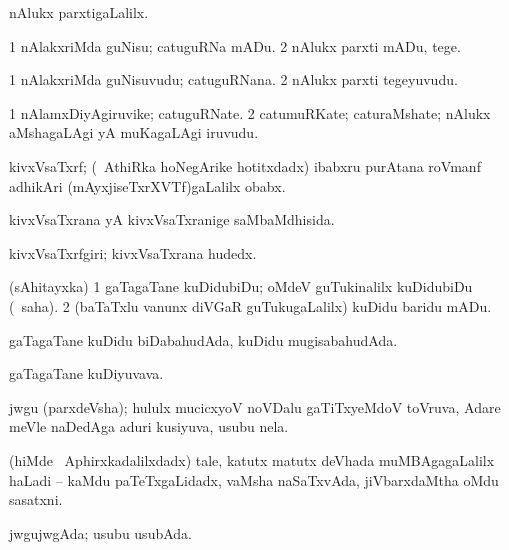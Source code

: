 \noindent
\gl{\pagu}
\bmng
{} nAlukx parxtigaLalilx. 
\emng
\eentry


\bentry
{}
\gl{\sakirx}
\bmng
\bnum
\num{1} nAlakxriMda guNisu; catuguRNa mADu. 
\num{2} nAlukx parxti mADu, tege. 
\enum
\emng
\eentry


\bentry
{}
\gl{\nA}
\bmng
\bnum
\num{1} nAlakxriMda guNisuvudu; catuguRNana. 
\num{2} nAlukx parxti tegeyuvudu. 
\enum
\emng
\eentry


\bentry
{}
\gl{\nA}
\bmng
\bnum
\num{1} nAlamxDiyAgiruvike; catuguRNate. 
\num{2} catumuRKate; caturaMshate; nAlukx aMshagaLAgi yA muKagaLAgi iruvudu. 
\enum
\emng
\eentry


\bentry
{}
\gl{\nA}
\bmng
kivxVsaTxrf; (\kanmu\ AthiRka hoNegArike hotitxdadx) ibabxru purAtana roVmanf adhikAri (mAyxjiseTxrXVTf)gaLalilx obabx. 
\emng
\eentry


\bentry
{}
\gl{\gu}
\bmng
kivxVsaTxrana yA kivxVsaTxranige saMbaMdhisida. 
\emng
\eentry

\bentry
{}
\gl{\nA}
\bmng
kivxVsaTxrfgiri; kivxVsaTxrana hudedx. 
\emng
\eentry

\bentry
{}
\gl{\sakirx}
\bmng
(sAhitayxka) 
\bnum
\num{1} gaTagaTane kuDidubiDu; oMdeV guTukinalilx kuDidubiDu (\akirx\ saha). 
\num{2} (baTaTxlu \mo vanunx diVGaR guTukugaLalilx) kuDidu baridu mADu. 
\enum
\emng
\eentry

\bentry
{}
\gl{\gu}
\bmng
gaTagaTane kuDidu biDabahudAda, kuDidu mugisabahudAda. 
\emng
\eentry

\bentry
{}
\gl{\nA}
\bmng
gaTagaTane kuDiyuvava. 
\emng
\eentry

\bentry
{}
\gl{\nA}
\bmng
jwgu (parxdeVsha); hululx mucicxyoV noVDalu gaTiTxyeMdoV toVruva, Adare meVle naDedAga aduri kusiyuva, usubu nela. 
\emng
\eentry

\bentry
{}
\gl{\nA}
\bmng
(hiMde \da\ Aphirxkadalilxdadx) tale, katutx matutx deVhada muMBAgagaLalilx haLadi -- kaMdu paTeTxgaLidadx, vaMsha naSaTxvAda, jiVbarxdaMtha oMdu sasatxni. 
\emng
\eentry

\bentry
{}
\gl{\gu}
\bmng
jwgujwgAda; usubu usubAda. 
\emng
\eentry

